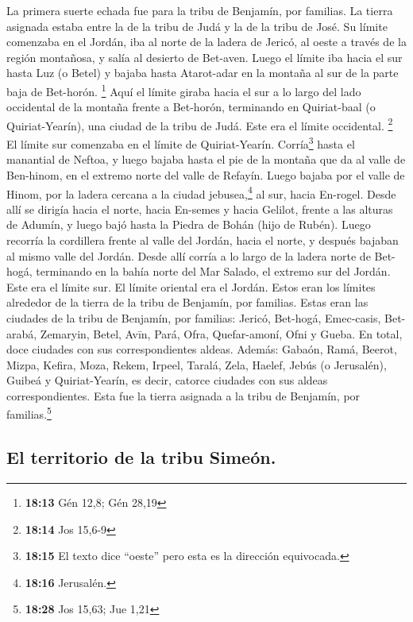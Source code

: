  La primera suerte echada fue para la tribu de Benjamín,
por familias. La tierra asignada estaba entre la de la tribu de Judá y
la de la tribu de José.  Su límite comenzaba en el
Jordán, iba al norte de la ladera de Jericó, al oeste a través de la
región montañosa, y salía al desierto de Bet-aven.  Luego
el límite iba hacia el sur hasta Luz (o Betel) y bajaba hasta
Atarot-adar en la montaña al sur de la parte baja de Bet-horón.
\footnote{\textbf{18:13} Gén 12,8; Gén 28,19}  Aquí el
límite giraba hacia el sur a lo largo del lado occidental de la montaña
frente a Bet-horón, terminando en Quiriat-baal (o Quiriat-Yearín), una
ciudad de la tribu de Judá. Este era el límite occidental. \footnote{\textbf{18:14}
  Jos 15,6-9}  El límite sur comenzaba en el límite de
Quiriat-Yearín. Corría\footnote{\textbf{18:15} El texto dice ``oeste''
  pero esta es la dirección equivocada.} hasta el manantial de Neftoa,
 y luego bajaba hasta el pie de la montaña que da al
valle de Ben-hinom, en el extremo norte del valle de Refayín. Luego
bajaba por el valle de Hinom, por la ladera cercana a la ciudad
jebusea,\footnote{\textbf{18:16} Jerusalén.} al sur, hacia En-rogel.
 Desde allí se dirigía hacia el norte, hacia En-semes y
hacia Gelilot, frente a las alturas de Adumín, y luego bajó hasta la
Piedra de Bohán (hijo de Rubén).  Luego recorría la
cordillera frente al valle del Jordán, hacia el norte, y después bajaban
al mismo valle del Jordán.  Desde allí corría a lo largo
de la ladera norte de Bet-hogá, terminando en la bahía norte del Mar
Salado, el extremo sur del Jordán. Este era el límite sur.
 El límite oriental era el Jordán. Estos eran los límites
alrededor de la tierra de la tribu de Benjamín, por familias.
 Estas eran las ciudades de la tribu de Benjamín, por
familias: Jericó, Bet-hogá, Emec-casis,  Bet-arabá,
Zemaryin, Betel,  Avīn, Pará, Ofra, 
Quefar-amoní, Ofni y Gueba. En total, doce ciudades con sus
correspondientes aldeas.  Además: Gabaón, Ramá, Beerot,
 Mizpa, Kefira, Moza,  Rekem, Irpeel,
Taralá,  Zela, Haelef, Jebús (o Jerusalén), Guibeá y
Quiriat-Yearín, es decir, catorce ciudades con sus aldeas
correspondientes. Esta fue la tierra asignada a la tribu de Benjamín,
por familias.\footnote{\textbf{18:28} Jos 15,63; Jue 1,21}

\hypertarget{el-territorio-de-la-tribu-simeuxf3n.}{%
\subsection{El territorio de la tribu
Simeón.}\label{el-territorio-de-la-tribu-simeuxf3n.}}

